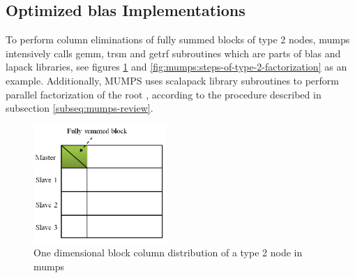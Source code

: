\subsection{Optimized \acrshort{blas} Implementations}
\label{subseq:blas-comparison}


To perform column eliminations of fully summed blocks of type 2 nodes, \acrshort{mumps} intensively calls \acrshort{gemm}, \acrshort{trsm} and \acrshort{getrf} subroutines  \cite{l2013introduction} which are parts of \acrshort{blas} and \acrshort{lapack} libraries, see figures \ref{fig:mumps:type-2-frontal-matrix} and  \ref{fig:mumps:steps-of-type-2-factorization} as an example. Additionally, MUMPS uses \acrshort{scalapack} library subroutines to perform parallel factorization of the root \cite{mumps-manual}, according to the procedure described in subsection \ref{subseq:mumps-review}. \\


\figpointer{\ref{fig:mumps:type-2-frontal-matrix}}
\begin{figure}[htpb]
  \centering
  \includegraphics[width=0.45\textwidth]{figures/chapter-2/mumps-type-2-frontal-matrix.png}
\caption{One dimensional block column distribution of a type 2 node in \acrshort{mumps}}
\label{fig:mumps:type-2-frontal-matrix}
\end{figure}


